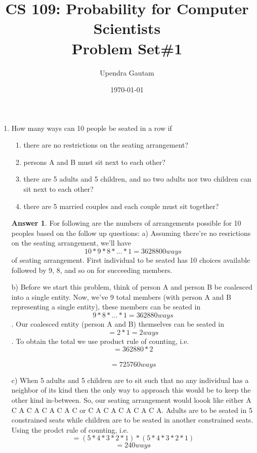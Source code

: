 \documentclass[12pt]{article}
\title{CS 109: Probability for Computer Scientists\\Problem Set\#1}
\author{Upendra Gautam} %
\date{\today} %
\renewcommand{\(}{\left(}
\renewcommand{\)}{\right)}
\theoremstyle{definition}
\newtheorem*{answer}{Answer}
\begin{document}
\maketitle
  
\begin{enumerate}
\item How many ways can 10 people be seated in a row if
    \begin{enumerate}[label=\alph*.]

    \item there are no restrictions on the seating arrangement?
    \item persons A and B must sit next to each other?
    \item there are 5 adults and 5 children, and no two adults nor two children can sit next to each other?
    \item there are 5 married couples and each couple must sit together?

    \end{enumerate}

    \begin{shaded}
    \begin{answer}
        For following are the numbers of arrangements possible for 10 peoples based on the follow up questions:
        a)
        Assuming there're no resrictions on the seating arrangement, we'll have \[10 * 9 * 8 * ... * 1 = 3628800 ways\] of seating arrangement.
        First individual to be seated has 10 choices available followed by 9, 8, and so on for succeeding members.

        b)
        Before we start this problem, think of person A and person B be coalesced into a single entity. Now, we've 9 total members (with person
        A and B representing a single entity), these members can be seated in \[9 * 8 * ... * 1 = 362880 ways\]. Our coalesced entity (person A and B)
        themselves can be seated in \[ = 2 * 1 = 2 ways\]. To obtain the total we use product rule of counting, i.e.
        \[= 362880 * 2 \]   \\
        \[= 725760 ways\]

        c)
        When 5 adults and 5 children are to sit such that no any individual has a neighbor of its kind then the only way to approach this
        would be to keep the other kind in-between. So, our seating arrangement would loook like either A C A C A C A C A C or C A C A C A C A C A.
        Adults are to be seated in 5 constrained seats while children are to be seated in another constrained seats. Using the prodct rule of counting, i.e.
        \[= (5 * 4 * 3 * 2 * 1) * (5 * 4 * 3 * 2 * 1) \]
        \[= 240 ways\]


\end{answer}
\end{shaded}
\end{enumerate}
\end{document}
